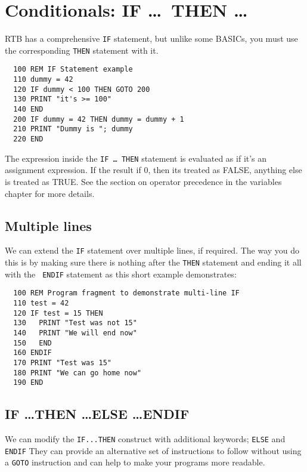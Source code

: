 \chapter{Conditionals: IF \dots\ THEN \dots}
RTB has a comprehensive {\tt IF} statement, but unlike some
BASICs, you must use the corresponding {\tt THEN} statement
with it.
\begin{verbatim}
  100 REM IF Statement example
  110 dummy = 42
  120 IF dummy < 100 THEN GOTO 200
  130 PRINT "it's >= 100"
  140 END
  200 IF dummy = 42 THEN dummy = dummy + 1
  210 PRINT "Dummy is "; dummy
  220 END
\end{verbatim}

The expression inside the {\tt IF \dots\ THEN} statement is evaluated
as if it's an assignment expression. If the result if 0, then its 
treated as FALSE, anything else is treated as TRUE. See the section
on operator precedence in the variables chapter for more details.

\section{Multiple lines}
We can extend the {\tt IF} statement over multiple lines, if
required. The way you do this is by making sure there is nothing after
the {\tt THEN} statement and ending it all with the {\tt
ENDIF} statement as this short example demonstrates:
\begin{verbatim}
  100 REM Program fragment to demonstrate multi-line IF
  110 test = 42
  120 IF test = 15 THEN
  130   PRINT "Test was not 15"
  140   PRINT "We will end now"
  150   END
  160 ENDIF
  170 PRINT "Test was 15"
  180 PRINT "We can go home now"
  190 END
\end{verbatim}

\section{IF \dots THEN \dots ELSE \dots ENDIF}
We can modify the {\tt IF...THEN} construct with additional keywords;
{\tt ELSE} and {\tt ENDIF} They can provide an alternative set of
instructions to follow without using a {\tt GOTO} instruction and can
help to make your programs more readable.

